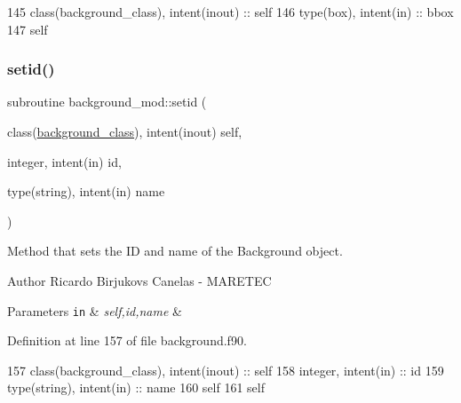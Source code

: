 \begin{DoxyCode}
145     \textcolor{keywordtype}{class}(background\_class), \textcolor{keywordtype}{intent(inout)} :: self
146     \textcolor{keywordtype}{type}(box), \textcolor{keywordtype}{intent(in)} :: bbox
147     self%
\end{DoxyCode}
\mbox{\label{namespacebackground__mod_a4feaccf688558d8590ece4f09c65c977}} 
\subsubsection{\texorpdfstring{setid()}{setid()}}
{\footnotesize\ttfamily subroutine background\+\_\+mod\+::setid (\begin{DoxyParamCaption}\item[{class(\mbox{\hyperlink{structbackground__mod_1_1background__class}{background\+\_\+class}}), intent(inout)}]{self,  }\item[{integer, intent(in)}]{id,  }\item[{type(string), intent(in)}]{name }\end{DoxyParamCaption})\hspace{0.3cm}{\ttfamily [private]}}



Method that sets the ID and name of the Background object. 

\begin{DoxyAuthor}{Author}
Ricardo Birjukovs Canelas -\/ M\+A\+R\+E\+T\+EC 
\end{DoxyAuthor}

\begin{DoxyParams}[1]{Parameters}
\mbox{\tt in}  & {\em self,id,name} & \\
\hline
\end{DoxyParams}


Definition at line 157 of file background.\+f90.


\begin{DoxyCode}
157     \textcolor{keywordtype}{class}(background\_class), \textcolor{keywordtype}{intent(inout)} :: self
158     \textcolor{keywordtype}{integer}, \textcolor{keywordtype}{intent(in)} :: id
159     \textcolor{keywordtype}{type}(string), \textcolor{keywordtype}{intent(in)} :: name
160     self%
161     self%
\end{DoxyCode}
\mbox{\label{namespacebackground__mod_a3cee95b9b5d3aae83df33334981f2b27}} 
